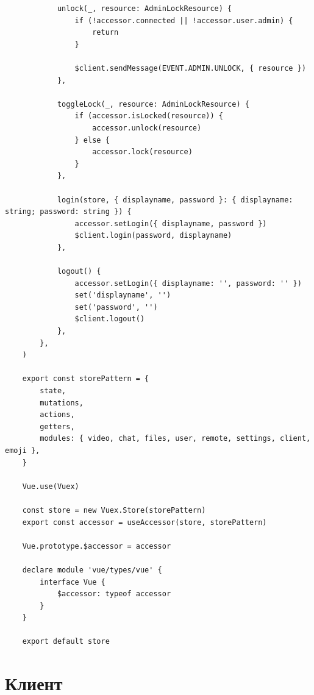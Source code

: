\begin{lstlisting}
			unlock(_, resource: AdminLockResource) {
				if (!accessor.connected || !accessor.user.admin) {
					return
				}
	
				$client.sendMessage(EVENT.ADMIN.UNLOCK, { resource })
			},
	
			toggleLock(_, resource: AdminLockResource) {
				if (accessor.isLocked(resource)) {
					accessor.unlock(resource)
				} else {
					accessor.lock(resource)
				}
			},
	
			login(store, { displayname, password }: { displayname: string; password: string }) {
				accessor.setLogin({ displayname, password })
				$client.login(password, displayname)
			},
	
			logout() {
				accessor.setLogin({ displayname: '', password: '' })
				set('displayname', '')
				set('password', '')
				$client.logout()
			},
		},
	)
	
	export const storePattern = {
		state,
		mutations,
		actions,
		getters,
		modules: { video, chat, files, user, remote, settings, client, emoji },
	}
	
	Vue.use(Vuex)
	
	const store = new Vuex.Store(storePattern)
	export const accessor = useAccessor(store, storePattern)
	
	Vue.prototype.$accessor = accessor
	
	declare module 'vue/types/vue' {
		interface Vue {
			$accessor: typeof accessor
		}
	}
	
	export default store
\end{lstlisting}
\pagebreak

\section{Клиент}

